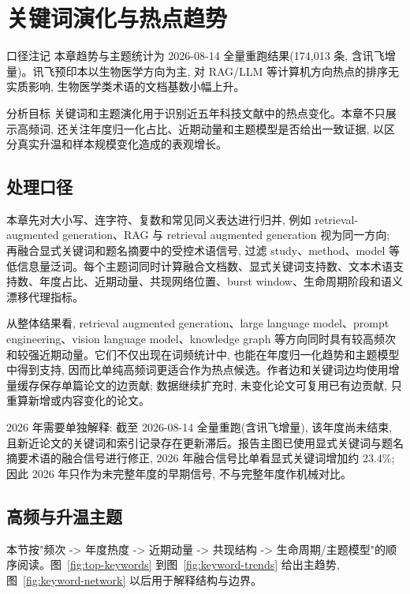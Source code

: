 \section{关键词演化与热点趋势}

\begin{reportbox}{口径注记}
本章趋势与主题统计为 2026-08-14 全量重跑结果(174,013 条, 含讯飞增量)。讯飞预印本以生物医学方向为主, 对 RAG/LLM 等计算机方向热点的排序无实质影响, 生物医学类术语的文档基数小幅上升。
\end{reportbox}

\begin{reportbox}{分析目标}
关键词和主题演化用于识别近五年科技文献中的热点变化。本章不只展示高频词, 还关注年度归一化占比、近期动量和主题模型是否给出一致证据, 以区分真实升温和样本规模变化造成的表观增长。
\end{reportbox}

\subsection{处理口径}

本章先对大小写、连字符、复数和常见同义表达进行归并, 例如 retrieval-augmented generation、RAG 与 retrieval augmented generation 视为同一方向; 再融合显式关键词和题名摘要中的受控术语信号, 过滤 study、method、model 等低信息量泛词。每个主题词同时计算融合文档数、显式关键词支持数、文本术语支持数、年度占比、近期动量、共现网络位置、burst window、生命周期阶段和语义漂移代理指标。

从整体结果看, retrieval augmented generation、large language model、prompt engineering、vision language model、knowledge graph 等方向同时具有较高频次和较强近期动量。它们不仅出现在词频统计中, 也能在年度归一化趋势和主题模型中得到支持, 因而比单纯高频词更适合作为热点候选。作者边和关键词边均使用增量缓存保存单篇论文的边贡献; 数据继续扩充时, 未变化论文可复用已有边贡献, 只重算新增或内容变化的论文。

\begin{methodnote}
2026 年需要单独解释: 截至 2026-08-14 全量重跑(含讯飞增量), 该年度尚未结束, 且新近论文的关键词和索引记录存在更新滞后。报告主图已使用显式关键词与题名摘要术语的融合信号进行修正, 2026 年融合信号比单看显式关键词增加约 23.4\%; 因此 2026 年只作为未完整年度的早期信号, 不与完整年度作机械对比。
\end{methodnote}

\subsection{高频与升温主题}
本节按"频次 -> 年度热度 -> 近期动量 -> 共现结构 -> 生命周期/主题模型"的顺序阅读。图~\ref{fig:top-keywords} 到图~\ref{fig:keyword-trends} 给出主趋势,图~\ref{fig:keyword-network} 以后用于解释结构与边界。

